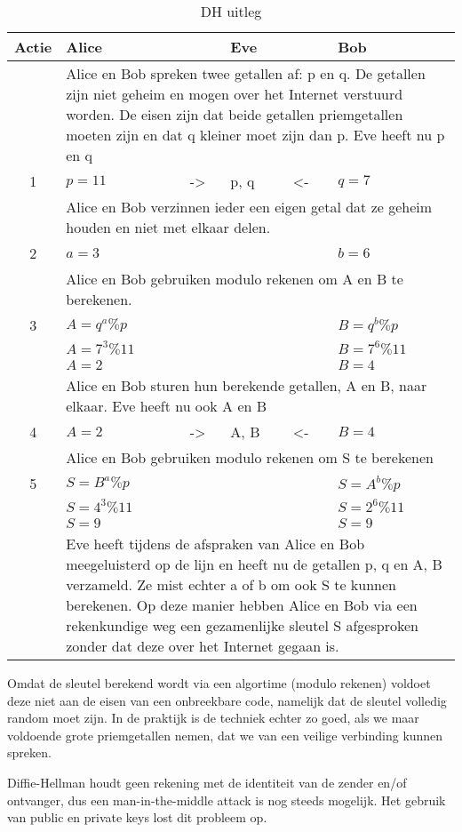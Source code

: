 \begin{table}[h]
\centering
	\begin{tabularx}{\textwidth}{ | c | X | m{1cm} | X | m{1cm} | X | }
	\hline
	Actie & Alice & & Eve & & Bob \\
	\hline
	& \multicolumn{5}{p{0.86\textwidth}|}{Alice en Bob spreken twee getallen af: p en q. De getallen zijn niet geheim en mogen over het Internet verstuurd worden. De eisen zijn dat beide getallen priemgetallen moeten zijn en dat q kleiner moet zijn dan p. Eve heeft nu p en q} \\
	\hline
	1 & $p=11$ & \centering-> & p, q & \centering<- & $q=7$ \\
	\hline
	& \multicolumn{5}{p{0.86\textwidth}|}{Alice en Bob verzinnen ieder een eigen getal dat ze geheim houden en niet met elkaar delen.} \\
	\hline
	2 & $a=3$ & & & & $b=6$ \\
	\hline
	& \multicolumn{5}{p{0.86\textwidth}|}{Alice en Bob gebruiken modulo rekenen om A en B te berekenen.} \\
	\hline
	3 & $A=q^a\%p$ & & & & $B=q^b\%p$ \\
	  & $A=7^3\%11$ & & & & $B=7^6\%11$ \\
	  & $A=2$ & & & & $B=4$ \\
	\hline
	& \multicolumn{5}{p{0.86\textwidth}|}{Alice en Bob sturen hun berekende getallen, A en B, naar elkaar. Eve heeft nu ook A en B} \\
	\hline
	4 & $A=2$ & \centering-> & A, B & \centering<- & $B=4$ \\
	\hline
	& \multicolumn{5}{p{0.86\textwidth}|}{Alice en Bob gebruiken modulo rekenen om S te berekenen} \\
	\hline
	5 & $S=B^a\%p$  & & & & $S=A^b\%p$ \\
	  & $S=4^3\%11$ & & & & $S=2^6\%11$ \\
	  & $S=9$       & & & & $S=9$ \\
	\hline
	& \multicolumn{5}{p{0.86\textwidth}|}{Eve heeft tijdens de afspraken van Alice en Bob meegeluisterd op de lijn en heeft nu de getallen p, q en A, B verzameld. Ze mist echter a of b om ook S te kunnen berekenen. Op deze manier hebben Alice en Bob via een rekenkundige weg een gezamenlijke sleutel S afgesproken zonder dat deze over het Internet gegaan is.} \\
	\hline
\end{tabularx}
\caption{DH uitleg}
\label{tab:dh}
\end{table}

Omdat de sleutel berekend wordt via een algortime (modulo rekenen) voldoet deze niet aan de eisen van een onbreekbare code, namelijk dat de sleutel volledig random moet zijn. In de praktijk is de techniek echter zo goed, als we maar voldoende grote priemgetallen nemen, dat we van een veilige verbinding kunnen spreken.

Diffie-Hellman houdt geen rekening met de identiteit van de zender en/of ontvanger, dus een man-in-the-middle attack is nog steeds mogelijk. Het gebruik van public en private keys lost dit probleem op.
